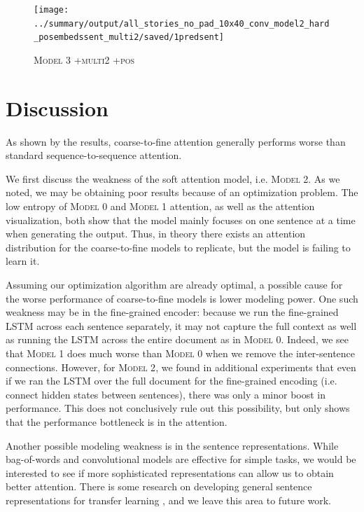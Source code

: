 \documentclass[12pt]{report}
\begin{document}
\begin{figure}[p]
\centering
\texttt{[image: ../summary/output/all\_stories\_no\_pad\_10x40\_conv\_model2\_hard\_posembedssent\_multi2/saved/1predsent]}
\caption[\textsc{Model 3 +multi2 +pos} Attention]{\textsc{Model 3 +multi2 +pos}}
\label{fig:last_attn}
\end{figure}



\chapter{Discussion}
\label{chap:discussion}

As shown by the results, coarse-to-fine attention generally performs worse than standard sequence-to-sequence attention.

We first discuss the weakness of the soft attention model, i.e. \textsc{Model 2}. As we noted, we may be obtaining poor results because of an optimization problem. The low entropy of \textsc{Model 0} and \textsc{Model 1} attention, as well as the attention visualization, both show that the model mainly focuses on one sentence at a time when generating the output. Thus, in theory there exists an attention distribution for the coarse-to-fine models to replicate, but the model is failing to learn it.

Assuming our optimization algorithm are already optimal, a possible cause for the worse performance of coarse-to-fine models is lower modeling power. One such weakness may be in the fine-grained encoder: because we run the fine-grained LSTM across each sentence separately, it may not capture the full context as well as running the LSTM across the entire document as in \textsc{Model 0}. Indeed, we see that \textsc{Model 1} does much worse than \textsc{Model 0} when we remove the inter-sentence connections.
However, for \textsc{Model 2}, we found in additional experiments that even if we ran the LSTM over the full document for the fine-grained encoding (i.e. connect hidden states between sentences), there was only a minor boost in performance. This does not conclusively rule out this possibility, but only shows that the performance bottleneck is in the attention.

Another possible modeling weakness is in the sentence representations. While bag-of-words and convolutional models are effective for simple tasks, we would be interested to see if more sophisticated representations can allow us to obtain better attention. There is some research on developing general sentence representations for transfer learning \citep{Bowman2016}, and we leave this area to future work.
\end{document}
